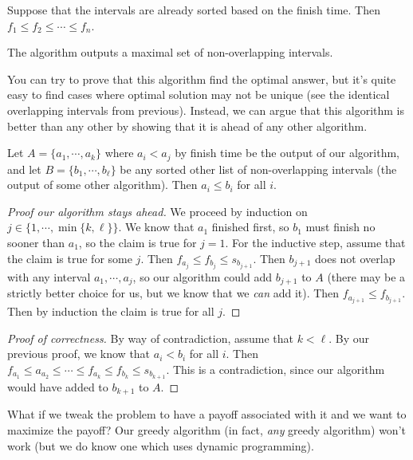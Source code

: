 \begin{problem}
Suppose that the intervals are already sorted based on the finish time. Then $f_1 \leq f_2 \leq \cdots \leq f_n$.

\begin{theorem}
The algorithm outputs a maximal set of non-overlapping intervals.
\end{theorem} \vspace{1ex}

\noindent You can try to prove that this algorithm find the optimal answer, but it's quite easy to find cases where optimal solution may not be unique (see the identical overlapping intervals from previous). Instead, we can argue that this algorithm is better than any other by showing that it is ahead of any other algorithm.

\begin{theorem}
Let $A = \{a_1, \cdots, a_k\}$ where $a_i < a_j$ by finish time be the output of our algorithm, and let $B = \{b_1, \cdots, b_\ell\}$ be any sorted other list of non-overlapping intervals (the output of some other algorithm). Then $a_i \leq b_i$ for all $i$.
\end{theorem}

\begin{proof}[Proof our algorithm stays ahead]
We proceed by induction on $j \in \{1, \cdots, \min\{k,\ell\}\}$.
We know that $a_1$ finished first, so $b_1$ must finish no sooner than $a_1$, so the claim is true for $j = 1$. For the inductive step, assume that the claim is true for some $j$. Then $f_{a_j} \leq f_{b_j} \leq s_{b_{j+1}}$. Then $b_{j+1}$ does not overlap with any interval $a_1, \cdots, a_j$, so our algorithm could add $b_{j+1}$ to $A$ (there may be a strictly better choice for us, but we know that we \emph{can} add it). Then $f_{a_{j+1}} \leq f_{b_{j+1}}$. Then by induction the claim is true for all $j$.
\end{proof}

\begin{proof}[Proof of correctness]
By way of contradiction, assume that $k < \ell$. By our previous proof, we know that $a_i < b_i$ for all $i$. Then $f_{a_1} \leq a_{a_2} \leq \cdots \leq f_{a_{k}} \leq f_{b_k} \leq s_{b_{k+1}}$. This is a contradiction, since our algorithm would have added to $b_{k+1}$ to $A$.
\end{proof}
\end{problem}

\begin{problem}
What if we tweak the problem to have a payoff associated with it and we want to maximize the payoff? Our greedy algorithm (in fact, \emph{any} greedy algorithm) won't work (but we do know one which uses dynamic programming).
\end{problem}
